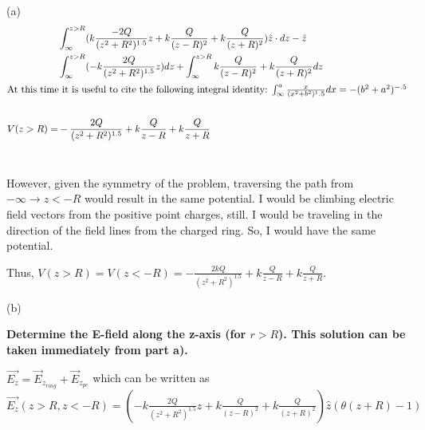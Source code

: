 \begin{homeworkProblem}
\begin{homeworkSection}{(a)}
\begin{align}
&\int_\infty^{z>R} (k \frac{-2Q}{(z^2+R^2)^{1.5}}z + k \frac{Q}{(z-R)^2}+ k \frac{Q}{(z+R)^2} ) \hat{z} \cdot dz -\hat{z} \nonumber \\
&\int_\infty^{z>R}  (-k \frac{2Q}{(z^2+R^2)^{1.5}}z) dz + \int_\infty^{z>R} k \frac{Q}{(z-R)^2} + k \frac{Q}{(z+R)^2} dz \nonumber \\
\intertext{At this time it is useful to cite the following integral identity: $\int_\infty^a \frac{x}{(x^2+b^2)^1.5}dx = -(b^2+a^2)^{-.5}$} \nonumber \\
V(z>R) = &-\frac{2Q}{(z^2+R^2)^{1.5}} + k\frac{Q}{z-R} + k\frac{Q}{z+R} \nonumber
\end{align}
\\ \par
However, given the symmetry of the problem, traversing the path from $-\infty \rightarrow z < -R$ would result in the same potential. I would be climbing electric field vectors from the positive point charges, still. I would be traveling in the direction of the field lines from the charged ring. So, I would have the same potential.
\\ \par
Thus, $V(z>R) = V(z<-R) = -\frac{2kQ}{(z^2+R^2)^{1.5}} + k\frac{Q}{z-R} + k\frac{Q}{z+R}$.


\end{homeworkSection}

\begin{homeworkSection}{(b)}
\\ \par
\textbf{Determine the E-field along the z-axis (for $r>R$). This solution can be taken immediately from part a). }

 $\vec{E_z} = \vec{E}_{z_{ring}} + \vec{E}_{z_{pc}}$ which can be written as $\vec{E_z}(z>R,z<-R) = (-k \frac{2Q}{(z^2+R^2)^{1.5}}z + k \frac{Q}{(z-R)^2} + k \frac{Q}{(z+R)^2} ) \hat{z} (\theta(z+R)-1)$

\end{homeworkSection}


\end{homeworkProblem}

